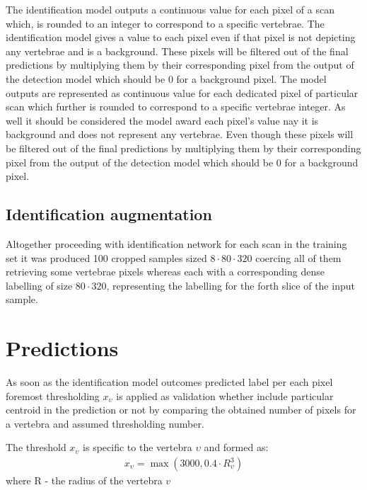 The identification model outputs a continuous value for each pixel of a scan which, is rounded to an integer to correspond to a specific vertebrae. The identification model gives a value to each pixel even if that pixel is not depicting any vertebrae and is a background. These pixels will be filtered out of the final predictions by multiplying them by their corresponding pixel from the output of the detection model which should be 0 for a background pixel. The model outputs are represented as continuous value for each dedicated pixel of particular scan which further is rounded to correspond to a specific vertebrae integer. As well it should be considered the model award each pixel's value nay it is background and does not represent any vertebrae. Even though these pixels will be filtered out of the final predictions by multiplying them by their corresponding pixel from the output of the detection model which should be 0 for a background pixel.

\subsection{Identification augmentation}
Altogether proceeding with identification network for each scan in the training set it was produced 100 cropped samples sized $8 \cdot 80 \cdot 320$ coercing all of them retrieving some vertebrae pixels whereas each with a corresponding dense labelling of size $80 \cdot 320$, representing the labelling for the forth slice of the input sample.

\section{Predictions}
As soon as the identification model outcomes predicted label per each pixel foremost thresholding $x_\upsilon$ is applied as validation whether include particular centroid in the prediction or not by comparing the obtained  number of pixels for a vertebra and assumed thresholding number.

The threshold $x_\upsilon$ is specific to the vertebra $\upsilon$ and formed as:
\begin{align*}
  x_\upsilon = \max(3000, 0.4 \cdot R_\upsilon^3) 
\end{align*}
where R - the radius of the vertebra $v$

